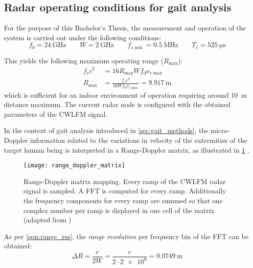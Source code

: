 \subsection{Radar operating conditions for gait analysis} \label{sec:radar_operating_conditions}

For the purpose of this Bachelor's Thesis, the measurement and operation of the system is carried out under the following conditions:
\begin{equation} \label{eq:if_conditions}
	f_0 = \SI{24}{\giga\hertz} \qquad W = \SI{2}{\giga\hertz} \qquad f_{s\min} = \SI{0.5}{\mega\hertz} \qquad T_c = \SI{525}{\micro\second}
\end{equation}

This yields the following maximum operating range ($R_{\max}$):
\begin{align}
	f_s c^2 &= 16 R_{\max}W f_0 \nu_{r\max} \\
	R_{\max} &= \frac{f_s c^2}{16 W f_0 \nu_{r\max}} = \SI{9.917}{\meter}
\end{align}
which is sufficient for an indoor environment of operation requiring around \SI{10}{\meter} distance maximum. The current radar node is configured with the obtained parameters of the CWLFM signal.

In the context of gait analysis introduced in \cref{sec:gait_methods}, the micro-Doppler information related to the variations in velocity of the extremities of the target human being is interpreted in a Range-Doppler matrix, as illustrated in \cref{fig:range_doppler_matrix} \cite{Amin2017,Richards2010,Senigagliesi2020}.

\begin{figure}[ht]
	\centering
	\texttt{[image: range\_doppler\_matrix]}
	\caption[Range-Doppler matrix mapping. Every ramp of the CWLFM radar signal is sampled. A FFT is computed for every ramp. Additionally the frequency components for every ramp are summed so that one complex number per ramp is displayed in one cell of the matrix]{Range-Doppler matrix mapping. Every ramp of the CWLFM radar signal is sampled. A FFT is computed for every ramp. Additionally the frequency components for every ramp are summed so that one complex number per ramp is displayed in one cell of the matrix  (adapted from \cite{Senigagliesi2020})}
	\label{fig:range_doppler_matrix}
\end{figure}

As per \cref{eqn:range_res}, the \textit{range resolution} per frequency bin of the FFT can be obtained:
\begin{equation} \label{eqn:range_res_ours}
	\Delta R = \frac{c}{2W} = \frac{c}{2 \cdot \num{2e9}} = \SI{0.0749}{\metre}
\end{equation}

